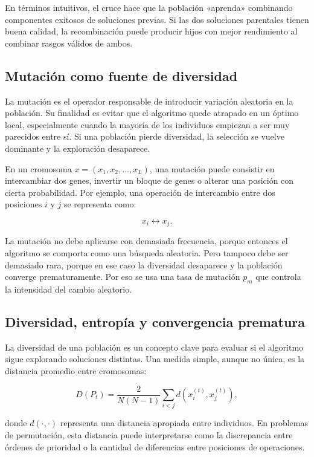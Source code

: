 \documentclass[11pt,a4paper]{article}
\begin{document}
En términos intuitivos, el cruce hace que la población «aprenda» combinando componentes exitosos de soluciones previas. Si las dos soluciones parentales tienen buena calidad, la recombinación puede producir hijos con mejor rendimiento al combinar rasgos válidos de ambos.

\subsection{Mutación como fuente de diversidad}

La mutación es el operador responsable de introducir variación aleatoria en la población. Su finalidad es evitar que el algoritmo quede atrapado en un óptimo local, especialmente cuando la mayoría de los individuos empiezan a ser muy parecidos entre sí. Si una población pierde diversidad, la selección se vuelve dominante y la exploración desaparece.

En un cromosoma $x = (x_1, x_2, \dots, x_L)$, una mutación puede consistir en intercambiar dos genes, invertir un bloque de genes o alterar una posición con cierta probabilidad. Por ejemplo, una operación de intercambio entre dos posiciones $i$ y $j$ se representa como:

$$
x_i \leftrightarrow x_j.
$$

La mutación no debe aplicarse con demasiada frecuencia, porque entonces el algoritmo se comporta como una búsqueda aleatoria. Pero tampoco debe ser demasiado rara, porque en ese caso la diversidad desaparece y la población converge prematuramente. Por eso se usa una tasa de mutación $p_m$ que controla la intensidad del cambio aleatorio.

\subsection{Diversidad, entropía y convergencia prematura}

La diversidad de una población es un concepto clave para evaluar si el algoritmo sigue explorando soluciones distintas. Una medida simple, aunque no única, es la distancia promedio entre cromosomas:

$$
D(P_t) = \frac{2}{N(N-1)} \sum_{i<j} d(x_i^{(t)}, x_j^{(t)}),
$$

 donde $d(\cdot,\cdot)$ representa una distancia apropiada entre individuos. En problemas de permutación, esta distancia puede interpretarse como la discrepancia entre órdenes de prioridad o la cantidad de diferencias entre posiciones de operaciones.
\end{document}
